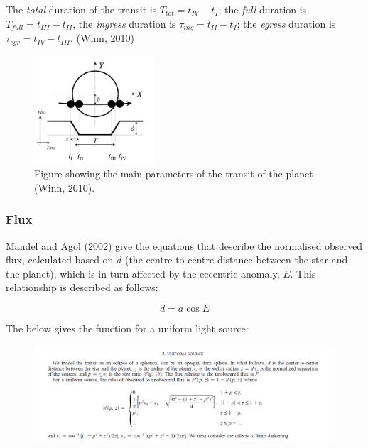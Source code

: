 \documentclass[11pt]{article}
\begin{document}
The \emph{total} duration of the transit is
\(T_{tot} = t_{IV} - t_{I}\); the \emph{full} duration is
\(T_{full} = t_{III} - t_{II}\), the \emph{ingress} duration is
\(\tau_{ing} = t_{II} - t_{I}\); the \emph{egress} duration is
\(\tau_{egr} = t_{IV} - t_{III}\). (Winn, 2010)


\begin{figure}[!ht]
	\centering
	\includegraphics[width=0.4\textwidth]{../images/transit_flux.png}
	\caption{Figure showing the main parameters of the transit of the planet (Winn, 2010).} \label{Figure 2.d}
\end{figure}



    \hypertarget{flux}{%
\subsubsection{Flux}\label{flux}}

Mandel and Agol (2002) give the equations that describe the normalised
observed flux, calculated based on \(d\) (the centre-to-centre distance
between the star and the planet), which is in turn affected by the
eccentric anomaly, \(E\). This relationship is described as follows:

\begin{equation*}
d = a\cos{E}
\end{equation*}

The below gives the function for a uniform light source:

\begin{figure}[H]
	\centering
	\includegraphics[width=\textwidth]{../images/uniform_source.png}
	\label{Figure 2.e}
\end{figure}
\end{document}
